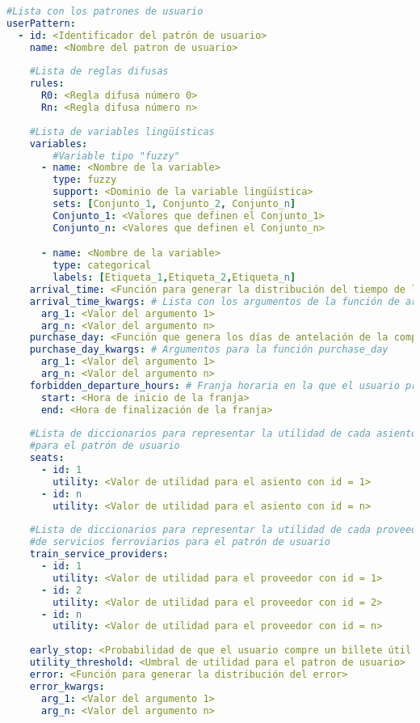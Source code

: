 \begin{lstlisting}[language=YAML,
                   frame=none,
                   numbers=none,
                   basicstyle=\ttfamily\normalsize,
                   caption={Estructura de la clave raíz \texttt{userPattern}},
                   label=src:estructuraUserPattern,
                   inputencoding=utf8]
#Lista con los patrones de usuario    
userPattern:
  - id: <Identificador del patrón de usuario>
    name: <Nombre del patron de usuario>
    
    #Lista de reglas difusas
    rules:
      R0: <Regla difusa número 0>
      Rn: <Regla difusa número n>
      
    #Lista de variables lingüísticas  
    variables:
        #Variable tipo "fuzzy"
      - name: <Nombre de la variable>
        type: fuzzy
        support: <Dominio de la variable lingüística>
        sets: [Conjunto_1, Conjunto_2, Conjunto_n]
        Conjunto_1: <Valores que definen el Conjunto_1>
        Conjunto_n: <Valores que definen el Conjunto_n>

      - name: <Nombre de la variable>
        type: categorical
        labels: [Etiqueta_1,Etiqueta_2,Etiqueta_n]
    arrival_time: <Función para generar la distribución del tiempo de llegada>
    arrival_time_kwargs: # Lista con los argumentos de la función de arrival_time
      arg_1: <Valor del argumento 1> 
      arg_n: <Valor del argumento n>
    purchase_day: <Función que genera los días de antelación de la compra del billete>
    purchase_day_kwargs: # Argumentos para la función purchase_day
      arg_1: <Valor del argumento 1> 
      arg_n: <Valor del argumento n>
    forbidden_departure_hours: # Franja horaria en la que el usuario prefiere no empezar el viaje
      start: <Hora de inicio de la franja>
      end: <Hora de finalización de la franja>
    
    #Lista de diccionarios para representar la utilidad de cada asiento
    #para el patrón de usuario
    seats:
      - id: 1
        utility: <Valor de utilidad para el asiento con id = 1>
      - id: n
        utility: <Valor de utilidad para el asiento con id = n>
    
    #Lista de diccionarios para representar la utilidad de cada proveedor
    #de servicios ferroviarios para el patrón de usuario
    train_service_providers:
      - id: 1
        utility: <Valor de utilidad para el proveedor con id = 1>
      - id: 2
        utility: <Valor de utilidad para el proveedor con id = 2>
      - id: n
        utility: <Valor de utilidad para el proveedor con id = n>
       
    early_stop: <Probabilidad de que el usuario compre un billete útil sin realizar una búsqueda exhaustiva>
    utility_threshold: <Umbral de utilidad para el patron de usuario>
    error: <Función para generar la distribución del error>
    error_kwargs:
      arg_1: <Valor del argumento 1> 
      arg_n: <Valor del argumento n>

\end{lstlisting}

